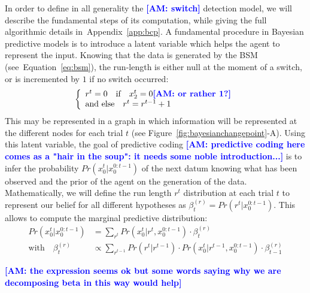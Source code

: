 \documentclass[12pt,english]{article}%
\newcommand{\choice}[1]{ %
	\left\{ %
		\begin{array}{l} #1 \end{array} %
	\right. }
\newcommand{\eql}[1]{\begin{equation}#1\end{equation}}
\newcommand{\eqa}[1]{\begin{align}#1\end{align}}
\newcommand{\seeFig}[1]{Figure~\ref{fig:#1}}
\newcommand{\seeEq}[1]{Equation~\ref{eq:#1}}
\newcommand{\seeApp}[1]{Appendix~\ref{app:#1}}
\newcommand{\AM}[1]{\textbf{\textcolor{blue}{[AM: #1]}}}
\begin{document}
In order to define in all generality the \AM{switch} detection model,
we will describe the fundamental steps of its computation,
while giving the full algorithmic details in~\seeApp{bcp}.
A fundamental procedure in Bayesian predictive models is to introduce
a latent variable which helps the agent to represent the input.
Knowing that the data is generated by the BSM (see~\seeEq{bsm}),
the run-length is either null at the moment of a switch,
or is incremented by $1$ if no switch occurred:
\eql{\choice{
r^t = 0 \quad \text{if} \quad x_2^t=0 \AM{or rather 1?} \\
\text{and else} \quad r^t = r^{t-1} +1 }\label{eq:run_length}}%
This may be represented in a graph 
in which information will be represented at the different nodes for each trial $t$ (see \seeFig{bayesianchangepoint}-A). 
Using this latent variable, the goal of predictive coding \AM{predictive coding here comes as a "hair in the soup": it needs some noble introduction...} is to 
infer the probability $Pr(x_0^t | x_0^{0:t-1})$ of the next datum 
knowing what has been observed and 
the prior of the agent on the generation of the data. 
Mathematically, we will define the run length $r^t$ distribution 
at each trial $t$ to represent our belief 
for all different hypotheses as $\beta^{(r)}_t=Pr(r^t | x_0^{0:t-1})$.
This allows to compute the marginal predictive distribution:
\eqa{
Pr(x_0^t | x_0^{0:t-1}) &= \sum_{r^{t}} Pr(x_0^t | r^{t}, x_0^{0:t-1}) \cdot  \beta^{(r)}_t \\
\text{with} \quad \beta^{(r)}_t &\propto \sum_{r^{t-1}}  Pr(r^t | r^{t-1}) \cdot  Pr(x_0^t | r^{t-1}, x_0^{0:t-1}) \cdot  \beta^{(r)}_{t-1}
\label{eq:pred}
}

\AM{the expression seems ok but some words saying why we are decomposing beta in this way would help} 
\end{document}
